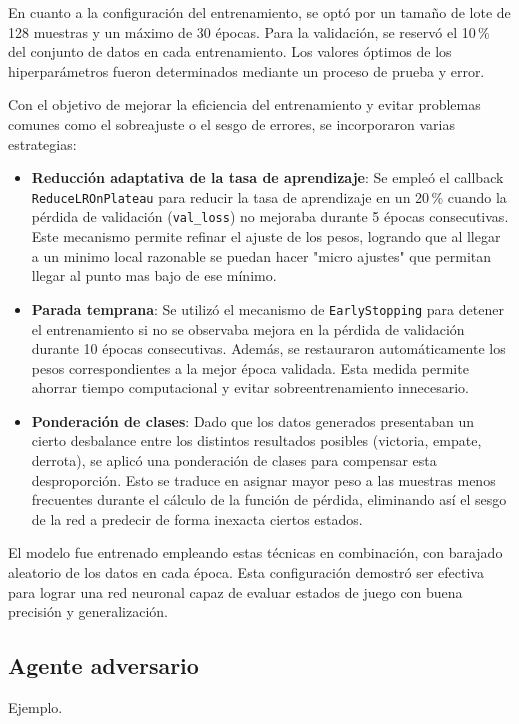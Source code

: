 \documentclass[conference]{IEEEtran}
\begin{document}
En cuanto a la configuración del entrenamiento, se optó por un tamaño de lote de 128 muestras y un máximo de 30 épocas. Para la validación, se reservó el 10\,\% del conjunto de datos en cada entrenamiento. Los valores óptimos de los hiperparámetros fueron determinados mediante un proceso de prueba y error.

Con el objetivo de mejorar la eficiencia del entrenamiento y evitar problemas comunes como el sobreajuste o el sesgo de errores, se incorporaron varias estrategias:

\begin{itemize}
    \item \textbf{Reducción adaptativa de la tasa de aprendizaje}: Se empleó el callback \texttt{ReduceLROnPlateau} para reducir la tasa de aprendizaje en un 20\,\% cuando la pérdida de validación (\texttt{val\_loss}) no mejoraba durante 5 épocas consecutivas. Este mecanismo permite refinar el ajuste de los pesos, logrando que al llegar a un minimo local razonable se puedan hacer "micro ajustes" que permitan llegar al punto mas bajo de ese mínimo.

    \item \textbf{Parada temprana}: Se utilizó el mecanismo de \texttt{EarlyStopping} para detener el entrenamiento si no se observaba mejora en la pérdida de validación durante 10 épocas consecutivas. Además, se restauraron automáticamente los pesos correspondientes a la mejor época validada. Esta medida permite ahorrar tiempo computacional y evitar sobreentrenamiento innecesario.

    \item \textbf{Ponderación de clases}: Dado que los datos generados presentaban un cierto desbalance entre los distintos resultados posibles (victoria, empate, derrota), se aplicó una ponderación de clases para compensar esta desproporción. Esto se traduce en asignar mayor peso a las muestras menos frecuentes durante el cálculo de la función de pérdida, eliminando así el sesgo de la red a predecir de forma inexacta ciertos estados.
\end{itemize}

El modelo fue entrenado empleando estas técnicas en combinación, con barajado aleatorio de los datos en cada época. Esta configuración demostró ser efectiva para lograr una red neuronal capaz de evaluar estados de juego con buena precisión y generalización.




\subsection{Agente adversario}
Ejemplo.
\end{document}
